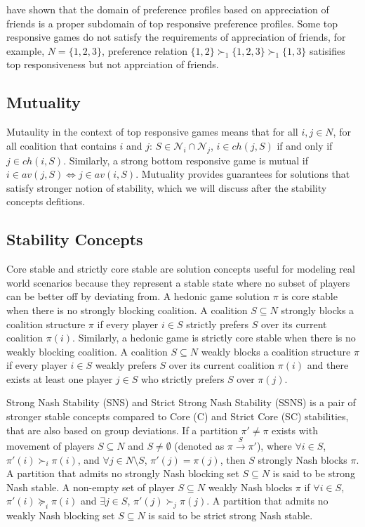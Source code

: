 \documentclass[letterpaper]{article} %
\begin{document}
\cite{SuSu10} have shown that the domain of preference profiles based on appreciation of friends is a proper subdomain of top responsive preference profiles. Some top responsive games do not satisfy the requirements of appreciation of friends, for example, $N = \{1, 2, 3\}$, preference relation $\{1, 2\} \succ_1 \{1, 2, 3\} \succ_1 \{1, 3\}$ satisifies top responsiveness but not apprciation of friends.

\subsection{Mutuality}
Mutaulity in the context of top responsive games means that for all $i, j \in N$, for all coalition that contains $i$ and $j$: $S \in \mathcal{N}_i \cap \mathcal{N}_j$, $i \in ch(j, S)$ if and only if $j \in ch(i, S)$. Similarly, a strong bottom responsive game is mutual if $i \in av(j, S) \iff j \in av(i, S)$. Mutuality provides guarantees for solutions that satisfy stronger notion of stability, which we will discuss after the stability concepts defitions.

\subsection{Stability Concepts}
Core stable and strictly core stable are solution concepts useful for modeling real world scenarios because they represent a stable state where no subset of players can be better off by deviating from. A hedonic game solution $\pi$ is core stable when there is no strongly blocking coalition. A coalition $S \subseteq N$ strongly blocks a coalition structure $\pi$ if every player $i \in S$ strictly prefers $S$ over its current coalition $\pi(i)$. Similarly, a hedonic game is strictly core stable when there is no weakly blocking coalition. A coalition $S \subseteq N$ weakly blocks a coalition structure $\pi$ if every player $i \in S$ weakly prefers $S$ over its current coalition $\pi(i)$ and there exists at least one player $j \in S$ who strictly prefers $S$ over $\pi(j)$.

Strong Nash Stability (SNS) and Strict Strong Nash Stability (SSNS) is a pair of stronger stable concepts compared to Core (C) and Strict Core (SC) stabilities, that are also based on group deviations. If a partition $\pi' \neq \pi$ exists with movement of players $S \subseteq N$ and $S \neq \emptyset$ (denoted as $\pi \xrightarrow{S} \pi'$), where $\forall i \in S$, $\pi'(i) \succ_i \pi(i)$, and $\forall j \in N\text{\textbackslash}S$, $\pi'(j) = \pi(j)$, then $S$ strongly Nash blocks $\pi$. A partition that admits no strongly Nash blocking set $S \subseteq N$ is said to be strong Nash stable. A non-empty set of player $S \subseteq N$ weakly Nash blocks $\pi$ if $\forall i \in S$, $\pi'(i) \succeq_i \pi(i)$ and $\exists j \in S$, $\pi'(j) \succ_j \pi(j)$. A partition that admits no weakly Nash blocking set $S \subseteq N$ is said to be strict strong Nash stable.
\end{document}
